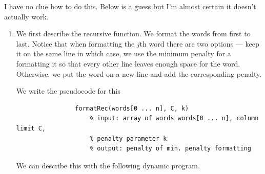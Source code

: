 \documentclass[12 pt, letterpaper]{hmcpset}
\begin{document}
\begin{solution}
	I have no clue how to do this. Below is a guess but I'm almost certain it doesn't actually work.

	\begin{enumerate}
		\item We first describe the recursive function. We format the words from first to last. Notice that when formatting the $j$th word there are two options --- keep it on the same line in which case, we use the minimum penalty for a formatting it so that every other line leaves enough space for the word. Otherwise, we put the word on a new line and add the corresponding penalty.

			We write the pseudocode for this

			\begin{verbatim}
				formatRec(words[0 ... n], C, k)
					% input: array of words words[0 ... n], column limit C,
					% penalty parameter k
					% output: penalty of min. penalty formatting

			\end{verbatim}

		We can describe this with the following dynamic program.
	\end{enumerate}
\end{solution}
\end{document}
